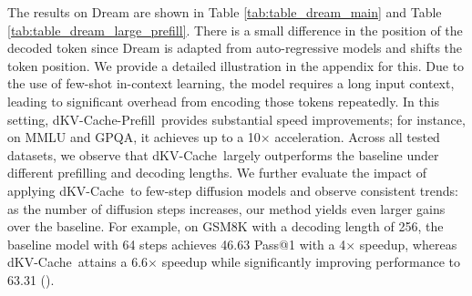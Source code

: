 \documentclass{article}
\newcommand{\methodname}{dKV-Cache}
\newcommand{\dmethodname}{dKV-Cache-Decode}
\newcommand{\mmethodname}{dKV-Cache-Greedy}
\newcommand{\pmethodname}{dKV-Cache-Prefill}
\newcommand{\speedtext}[1]{{\small \color{fontblue}{#1}}}
\newcounter{mycounter} %
\newcommand{\findingbox}[1]{
    \stepcounter{mycounter} %
    \begin{tcolorbox}[colframe=black,
                      arc=1pt,
                      boxsep=-2pt,
                      ]
        \noindent{\textbf{\textit{Finding \themycounter.}}} #1
    \end{tcolorbox}
}
\begin{document}
The results on Dream are shown in Table \ref{tab:table_dream_main} and Table \ref{tab:table_dream_large_prefill}. There is a small difference in the position of the decoded token since Dream is adapted from auto-regressive models and shifts the token position. We provide a detailed illustration in the appendix for this. Due to the use of few-shot in-context learning, the model requires a long input context, leading to significant overhead from encoding those tokens repeatedly. In this setting, \pmethodname\ provides substantial speed improvements; for instance, on MMLU and GPQA, it achieves up to a 10$\times$ acceleration. Across all tested datasets, we observe that \methodname\ largely outperforms the baseline under different prefilling and decoding lengths. 
We further evaluate the impact of applying \methodname\ to few-step diffusion models and observe consistent trends: as the number of diffusion steps increases, our method yields even larger gains over the baseline. For example, on GSM8K with a decoding length of 256, the baseline model with 64 steps achieves 46.63 Pass@1 with a 4$\times$ speedup, whereas \methodname\ attains a 6.6$\times$ speedup while significantly improving performance to 63.31 (\speedtext{+16.68}). 




\end{document}
